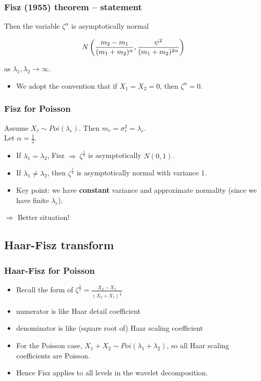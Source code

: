 \documentclass{beamer}
\def\la{\lambda}
\def\im{{\Rightarrow}}
\def\beq{\begin{equation}}
\def\eeq{\end{equation}}
\begin{document}
\begin{frame}
\frametitle{Fisz (1955) theorem -- statement}

Then the variable $\zeta^{\alpha}$ is asymptotically normal

\vspace{.5cm}

\beq{\label{fiszasym}} N
\left(\frac{m_{2}-m_{1}}{(m_{1}+m_{2})^{\alpha}},\frac{\psi^2}{(m_{1}+m_{2})^{2\alpha}}\right)
\eeq

as $\la_{1}, \la_{2} \to \infty$.\pause

\vspace{.5cm}
\begin{itemize}
\item We adopt the convention that if $X_{1}=X_{2}=0$, then
$\zeta^{\alpha}=0$.
\end{itemize}
\end{frame}

\begin{frame}
\frametitle{Fisz for Poisson}

Assume $X_r \sim Poi(\la_r)$. Then $m_r=\sigma_r^2=\la_r$.\\
\pause Let $\alpha=\frac{1}{2}$.\pause
\begin{itemize}
\item If $\la_1=\la_2$, Fisz $\im \ \zeta^{\frac{1}{2}}$ is
asymptotically $N(0,1)$. \pause
\item If $\la_1\neq\la_2$, then $\zeta^{\frac{1}{2}}$ is
asymptotically normal with variance 1.\pause
\vspace{.5cm}
\item Key point: we have {\bf{constant}} variance and approximate normality (since we have finite
$\la_r$).\pause
\end{itemize}
\vspace{.2cm} $\im$ Better situation!
\end{frame}

\subsection{Haar-Fisz transform}
\begin{frame}
\frametitle{Haar-Fisz for Poisson}
\begin{itemize}
\item Recall the form of
$\zeta^{\frac{1}{2}}=\frac{X_{2}-X_{1}}{(X_{2}+X_{1})^{\frac{1}{2}}}$\pause
\vspace{.5cm}
\item numerator is like Haar detail coefficient\pause
\item denominator is like (square root of) Haar scaling coefficient\pause
\item For the Poisson case, $X_1+X_2\sim Poi(\la_1+\la_2)$, so all
Haar scaling coefficients are Poisson.\pause
\item Hence Fisz applies to all levels in the wavelet decomposition.
\end{itemize}
\end{frame}
\end{document}
